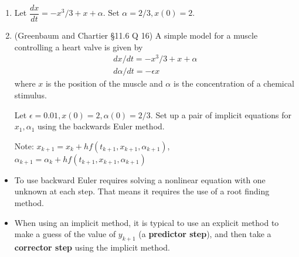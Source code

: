 \documentclass[12pt,letterpaper,noanswers]{exam}
\begin{document}
\begin{enumerate}[resume]
\item Let $\dfrac{dx}{dt} = -x^3/3 + x + \alpha$.  Set $\alpha = 2/3, x(0) = 2$.  

\item (Greenbaum and Chartier \S 11.6 Q 16) A simple model for a muscle controlling a heart valve is given by \[\displaystyle\begin{array}{l} dx/dt = -x^3/3 + x + \alpha \\
d\alpha/dt= -\epsilon x \end{array}\]
where $x$ is the position of the muscle and $\alpha$ is the concentration of a chemical stimulus.

Let $\epsilon = 0.01, x(0) = 2, \alpha(0) = 2/3$.  Set up a pair of implicit equations for $x_1, \alpha_1$ using the backwards Euler method.  

Note: $x_{k+1} = x_k + hf(t_{k+1},x_{k+1},\alpha_{k+1})$, $\alpha_{k+1} = \alpha_k + hf(t_{k+1},x_{k+1},\alpha_{k+1})$ 
\vspace{1in}
\end{enumerate}
\begin{tcolorbox}
\begin{itemize}\itemsep0pt
        \item To use backward Euler requires solving a nonlinear equation with one unknown at each step.  That means it requires the use of a root finding method.
    \item When using an implicit method, it is typical to use an explicit method to make a guess of the value of $y_{k+1}$ (a \textbf{predictor step}), and then take a \textbf{corrector step} using the implicit method.
\end{itemize}
\end{tcolorbox}
\end{document}
